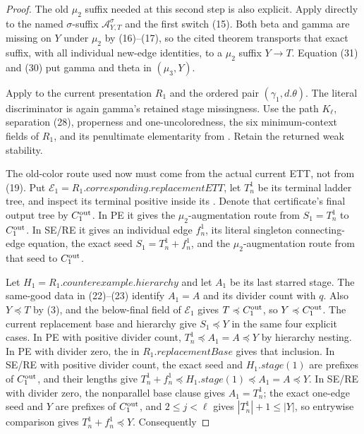 \begin{proof}
The old $\mu_2$ suffix needed at this second step is also explicit.  Apply
 directly to the named
$\sigma$-suffix $\mathcal A_{Y,T}^{\sigma}$ and the first switch (15).
Both beta and gamma are missing on $Y$ under $\mu_2$ by (16)--(17), so the
cited theorem transports that exact suffix, with all individual new-edge
identities, to a $\mu_2$ suffix $Y\to T$.
Equation (31) and (30) put gamma and theta in
$(\mu_3,Y)$.

Apply  to the current presentation
$R_1$ and the ordered pair $(\gamma_1,d.\theta)$.  The literal
discriminator is again gamma's retained stage missingness.  Use the path
$K_\ell$, separation (28), properness and one-uncoloredness, the six
minimum-context fields of $R_1$, and its penultimate elementarity from
.  Retain the
returned weak stability.

The old-color route used now must come from the actual current ETT, not
from (19).  Put
$\mathcal E_1=R_1.\mathit{corresponding.replacementETT}$, let $T_n^1$ be
its terminal ladder tree, and inspect its terminal positive
 inside its .
Denote that certificate's final output tree by $C_1^{\rm out}$.  In PE
it gives the $\mu_2$-augmentation route from $S_1=T_n^1$ to
$C_1^{\rm out}$.  In SE/RE it gives an individual edge $f_n^1$, its
literal singleton connecting-edge equation, the exact
 seed $S_1=T_n^1+f_n^1$, and the
$\mu_2$-augmentation route from that seed to $C_1^{\rm out}$.

Let $H_1=R_1.\mathit{counterexample.hierarchy}$ and let $A_1$ be its last
starred stage.  The same-good data in (22)--(23) identify $A_1=A$ and its
divider count with $q$.  Also $Y\preccurlyeq T$ by (3), and the
below-final field of $\mathcal E_1$ gives
$T\preccurlyeq C_1^{\rm out}$, so $Y\preccurlyeq C_1^{\rm out}$.  The
current replacement base and hierarchy give $S_1\preccurlyeq Y$ in the
same four explicit cases.  In PE with positive divider count,
$T_n^1\preccurlyeq A_1= A\preccurlyeq Y$ by hierarchy nesting.  In PE
with divider zero, the  in
$R_1.\mathit{replacementBase}$ gives that inclusion.  In SE/RE with
positive divider count, the exact seed and $H_1.\mathit{stage}(1)$ are
prefixes of $C_1^{\rm out}$, and their lengths give
$T_n^1+f_n^1\preccurlyeq H_1.\mathit{stage}(1)
 \preccurlyeq A_1=A\preccurlyeq Y$.  In SE/RE with divider zero, the
nonparallel base clause gives $A_1=T_n^1$; the exact one-edge seed and
$Y$ are prefixes of $C_1^{\rm out}$, and $2\le j<\ell$ gives
$|T_n^1|+1\le |Y|$, so entrywise comparison gives
$T_n^1+f_n^1\preccurlyeq Y$.  Consequently


\end{proof}
